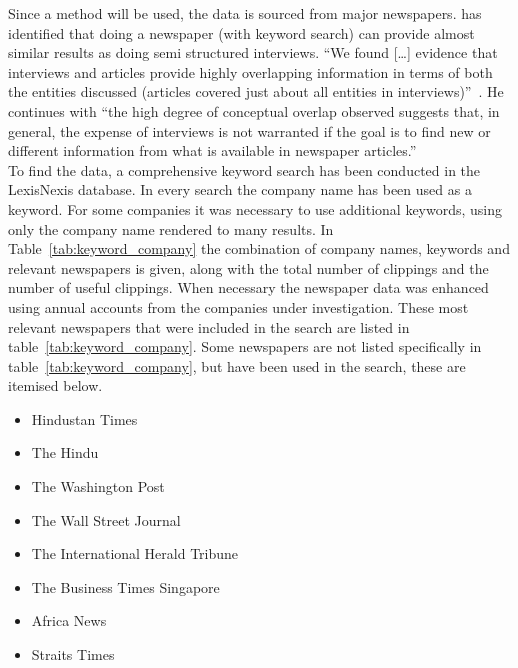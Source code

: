 Since a \mcs method will be used, the data is sourced from major newspapers.
\cite{Martin:2013fz} has identified that doing a newspaper (with keyword search) can provide almost similar results as doing semi structured interviews.
``We found [\ldots] evidence that interviews and articles provide highly overlapping information in terms of both the entities discussed (articles covered just about all entities in interviews)''~\citep[p.10]{Martin:2013fz}.
He continues with ``the high degree of conceptual overlap observed suggests that, in general, the expense of interviews is not warranted if the goal is to find new or different information from what is available in newspaper articles.''~\citep[p.10]{Martin:2013fz}\\
To find the data, a comprehensive keyword search has been conducted in the LexisNexis database. 
In every search the company name has been used as a keyword.
For some companies it was necessary to use additional keywords, using only the company name rendered to many results. 
In Table~\ref{tab:keyword_company} the combination of company names, keywords and  relevant newspapers is given, along with the total number of clippings and the number of useful clippings. 
When necessary the newspaper data was enhanced using annual accounts from the companies under investigation.
These most relevant newspapers that were included in the search are listed in table~\ref{tab:keyword_company}.
Some newspapers are not listed specifically in table~\ref{tab:keyword_company}, but have been used in the search, these are itemised below.
 \begin{itemize}%
\item Hindustan Times%
\item The Hindu %
\item The Washington Post
\item The Wall Street Journal
\item The International Herald Tribune
\item The Business Times Singapore
\item Africa News
\item Straits Times
\end{itemize}

